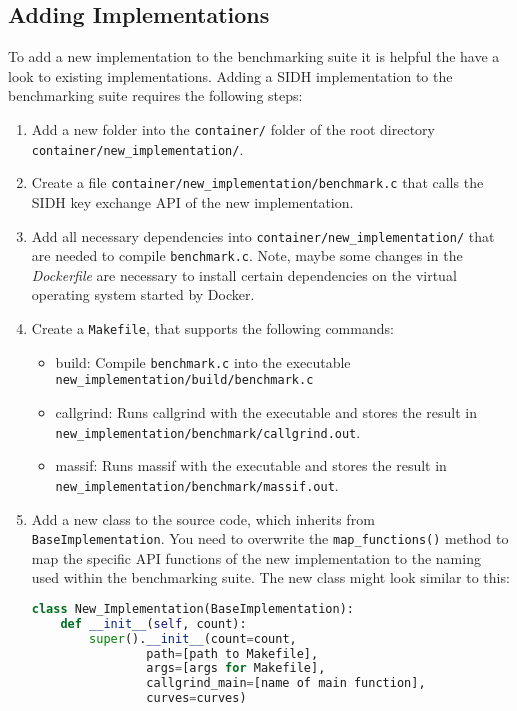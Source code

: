 \subsection{Adding Implementations}
To add a new implementation to the benchmarking suite it is helpful the have a look to existing implementations. Adding a SIDH implementation to the benchmarking suite requires the following steps:
\begin{enumerate}
\item Add a new folder into the \texttt{container/} folder of the root directory \\ \texttt{container/new\_implementation/}.
\item Create a file \texttt{container/new\_implementation/benchmark.c} that calls the SIDH key exchange API of the new implementation.
\item Add all necessary dependencies into \texttt{container/new\_implementation/} that are needed to compile \texttt{benchmark.c}. Note, maybe some changes in the \textit{Dockerfile} are necessary to install certain dependencies on the virtual operating system started by Docker.
\item Create a \texttt{Makefile}, that supports the following commands:
	\begin{itemize}
		\item build: Compile \texttt{benchmark.c} into the executable \\ \texttt{new\_implementation/build/benchmark.c}
		\item callgrind: Runs callgrind with the executable and stores the result in\\ \texttt{new\_implementation/benchmark/callgrind.out}.
		\item massif: Runs massif with the executable and stores the result in\\ \texttt{new\_implementation/benchmark/massif.out}.
	\end{itemize}
\item Add a new class to the source code, which inherits from \texttt{BaseImplementation}. You need to overwrite the \texttt{map\_functions()} method to map the specific API functions of the new implementation to the naming used within the benchmarking suite. The new class might look similar to this:

\begin{lstlisting}[language=Python]
class New_Implementation(BaseImplementation):
    def __init__(self, count):
        super().__init__(count=count,
				path=[path to Makefile], 
				args=[args for Makefile],
				callgrind_main=[name of main function],
				curves=curves)


\end{lstlisting}
\end{enumerate}
